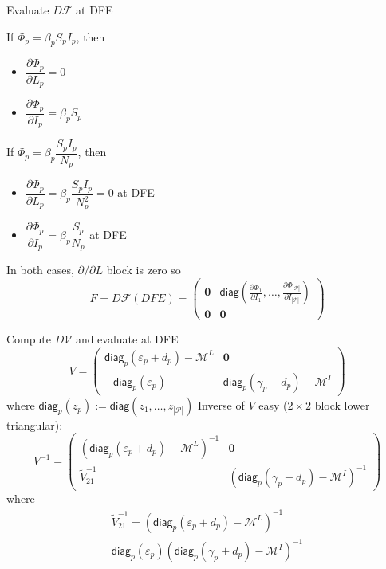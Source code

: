 \documentclass[aspectratio=43]{beamer}
\begin{document}
\begin{frame}{Evaluate $D\mathcal{F}$ at DFE}
	\begin{minipage}[t]{0.45\textwidth}
		If $\Phi_p=\beta_pS_pI_p$, then
		\begin{itemize}
			\item $\dfrac{\partial\Phi_p}{\partial L_p}=0$
			\item $\dfrac{\partial\Phi_p}{\partial I_p}=\beta_pS_p$
		\end{itemize}
	\end{minipage}
	\begin{minipage}[t]{0.45\textwidth}
		If $\Phi_p=\beta_p\dfrac{S_pI_p}{N_p}$, then
		\begin{itemize}
			\item $\dfrac{\partial\Phi_p}{\partial L_p}=\beta_p\dfrac{S_pI_p}{N_p^2}=0$ at DFE
			\item $\dfrac{\partial\Phi_p}{\partial I_p}=\beta_p\dfrac{S_p}{N_p}$ at DFE
		\end{itemize}
	\end{minipage}
	\vfill
In both cases, $\partial/\partial L$ block is zero so
$$
F=D\mathcal{F}(DFE)=
\begin{pmatrix}
\mathbf{0} & \mathsf{diag}\left(
\frac{\partial\Phi_1}{\partial I_1},\ldots,\frac{\partial\Phi_{|\mathcal{P}|}}{\partial I_{|\mathcal{P}|}}\right) \\
\mathbf{0} & \mathbf{0}
\end{pmatrix}
$$
\end{frame}

\begin{frame}{Compute $D\mathcal{V}$ and evaluate at DFE}
$$
V=
\begin{pmatrix}
\mathsf{diag}_p(\varepsilon_p+d_p)-\mathcal{M}^L & \mathbf{0} \\
-\mathsf{diag}_p(\varepsilon_p) & \mathsf{diag}_p(\gamma_p+d_p)-\mathcal{M}^I
\end{pmatrix}
$$
where $\mathsf{diag}_p(z_p):=\mathsf{diag}(z_1,\ldots,z_{|\mathcal{P}|})$
\vfill
Inverse of $V$ easy ($2\times 2$ block lower triangular):
$$
V^{-1}
=
\begin{pmatrix}
\left(\mathsf{diag}_p(\varepsilon_p+d_p)-\mathcal{M}^L\right)^{-1} & \mathbf{0} \\
\tilde V_{21}^{-1} & \left(\mathsf{diag}_p(\gamma_p+d_p)-\mathcal{M}^I\right)^{-1}
\end{pmatrix}
$$
where
\begin{multline*}
	\tilde V_{21}^{-1}=
	\left(\mathsf{diag}_p(\varepsilon_p+d_p)-\mathcal{M}^L\right)^{-1}\\ 
	\mathsf{diag}_p(\varepsilon_p)
	\left(\mathsf{diag}_p(\gamma_p+d_p)-\mathcal{M}^I\right)^{-1}		
\end{multline*}
\end{frame}
\end{document}
